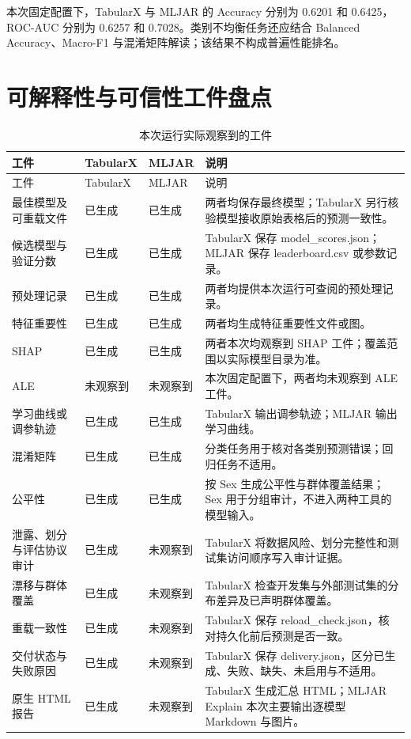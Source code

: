 \documentclass[degree=bachelor,language=chinese,fontset=fandol]{thuthesis}
\newcommand{\yes}{\textcolor{green!50!black}{已生成}}
\newcommand{\no}{\textcolor{red!70!black}{未观察到}}
\begin{document}
本次固定配置下，TabularX 与 MLJAR 的 Accuracy 分别为 0.6201 和 0.6425，ROC-AUC 分别为 0.6257 和 0.7028。类别不均衡任务还应结合 Balanced Accuracy、Macro-F1 与混淆矩阵解读；该结果不构成普遍性能排名。

\section{可解释性与可信性工件盘点}
\begin{longtable}{>{\raggedright\arraybackslash}p{}>{\centering\arraybackslash}p{}>{\centering\arraybackslash}p{}>{\raggedright\arraybackslash}p{}}
  \caption{本次运行实际观察到的工件}\label{tab:artifacts}\\
  \toprule
  工件 & TabularX & MLJAR & 说明 \\
  \midrule
  \endfirsthead
  \toprule
  工件 & TabularX & MLJAR & 说明 \\
  \midrule
  \endhead
  最佳模型及可重载文件 & \yes & \yes & 两者均保存最终模型；TabularX 另行核验模型接收原始表格后的预测一致性。 \\
  候选模型与验证分数 & \yes & \yes & TabularX 保存 model\_scores.json；MLJAR 保存 leaderboard.csv 或参数记录。 \\
  预处理记录 & \yes & \yes & 两者均提供本次运行可查阅的预处理记录。 \\
  特征重要性 & \yes & \yes & 两者均生成特征重要性文件或图。 \\
  SHAP & \yes & \yes & 两者本次均观察到 SHAP 工件；覆盖范围以实际模型目录为准。 \\
  ALE & \no & \no & 本次固定配置下，两者均未观察到 ALE 工件。 \\
  学习曲线或调参轨迹 & \yes & \yes & TabularX 输出调参轨迹；MLJAR 输出学习曲线。 \\
  混淆矩阵 & \yes & \yes & 分类任务用于核对各类别预测错误；回归任务不适用。 \\
  公平性 & \yes & \yes & 按 Sex 生成公平性与群体覆盖结果；Sex 用于分组审计，不进入两种工具的模型输入。 \\
  泄露、划分与评估协议审计 & \yes & \no & TabularX 将数据风险、划分完整性和测试集访问顺序写入审计证据。 \\
  漂移与群体覆盖 & \yes & \no & TabularX 检查开发集与外部测试集的分布差异及已声明群体覆盖。 \\
  重载一致性 & \yes & \no & TabularX 保存 reload\_check.json，核对持久化前后预测是否一致。 \\
  交付状态与失败原因 & \yes & \no & TabularX 保存 delivery.json，区分已生成、失败、缺失、未启用与不适用。 \\
  原生 HTML 报告 & \yes & \no & TabularX 生成汇总 HTML；MLJAR Explain 本次主要输出逐模型 Markdown 与图片。 \\
  \bottomrule
\end{longtable}
\end{document}
